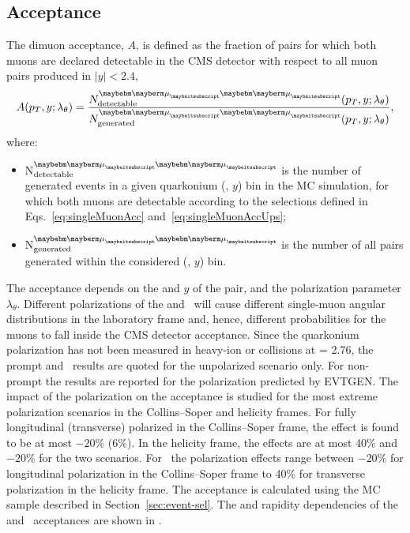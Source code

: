\subsection{Acceptance}
\label{sec:acc}
The dimuon acceptance, $A$, is defined as the fraction of \mumu pairs
for which both muons are declared detectable in the CMS detector with
respect to all muon pairs produced in $|y|<2.4$,
\begin{equation}
  \label{eq:acc}
    A(\pt,y;\lambda_{\theta}) = \frac{N^{\Pgm\Pgm}_{\text{detectable}}(\pt,y;\lambda_{\theta})}{N^{\Pgm\Pgm}_{\text{generated}}(\pt,y;\lambda_{\theta})},
\end{equation}
where:
\begin{itemize}
\item N$^{\Pgm\Pgm}_{\text{detectable}}$ is the number of generated
  events in a given quarkonium (\pt, $y$) bin in the MC simulation,
  for which both muons are detectable according to the selections
  defined in Eqs.~\eqref{eq:singleMuonAcc}
  and~\eqref{eq:singleMuonAccUps};
\item N$^{\Pgm\Pgm}_{\text{generated}}$ is the number of all \mumu pairs
  generated within the considered (\pt, $y$) bin.
\end{itemize}
The acceptance depends on the \pt and $y$ of the \mumu pair, and the
polarization parameter $\lambda_{\theta}$. Different polarizations of
the \Jpsi and \PgUa\ will cause different single-muon angular
distributions in the laboratory frame and, hence, different
probabilities for the muons to fall inside the CMS detector
acceptance. Since the quarkonium polarization has not been measured in
heavy-ion or \pp collisions at \sqrtsnn = 2.76\TeV, the prompt \Jpsi
and \PgUa\ results are quoted for the unpolarized scenario only. For
non-prompt \Jpsi the results are reported for the polarization
predicted by EVTGEN. The impact of the polarization on the
acceptance is studied for the most extreme polarization scenarios in
the Collins--Soper and helicity frames. For fully longitudinal
(transverse) polarized \Jpsi in the Collins--Soper frame, the effect
is found to be at most $-20\%$ (6\%). In the helicity frame, the
effects are at most 40\% and $-20\%$ for the two scenarios. For \PgUa\
the polarization effects range between $-20\%$ for longitudinal
polarization in the Collins--Soper frame to 40\% for transverse
polarization in the helicity frame.
The acceptance is calculated using the MC sample described in
Section~\ref{sec:event-sel}. The \pt and rapidity dependencies of the
\Jpsi and \PgUa\ acceptances are shown in \fig{fig:acceptance}.

